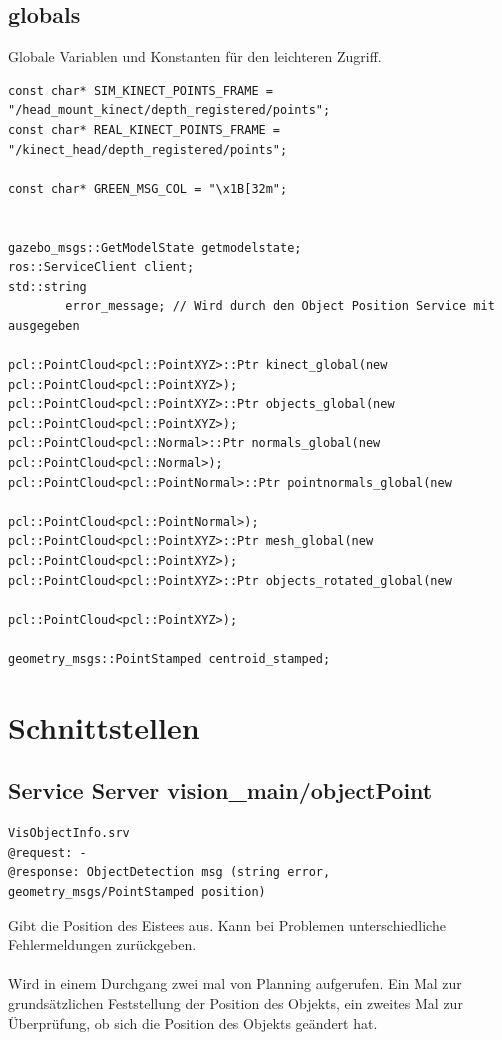 \documentclass{suturo}
\begin{document}
\subsection{globals}
Globale Variablen und Konstanten für den leichteren Zugriff.

\begin{verbatim}
const char* SIM_KINECT_POINTS_FRAME = "/head_mount_kinect/depth_registered/points";
const char* REAL_KINECT_POINTS_FRAME = "/kinect_head/depth_registered/points";

const char* GREEN_MSG_COL = "\x1B[32m";


gazebo_msgs::GetModelState getmodelstate;
ros::ServiceClient client;
std::string
        error_message; // Wird durch den Object Position Service mit ausgegeben

pcl::PointCloud<pcl::PointXYZ>::Ptr kinect_global(new pcl::PointCloud<pcl::PointXYZ>);
pcl::PointCloud<pcl::PointXYZ>::Ptr objects_global(new pcl::PointCloud<pcl::PointXYZ>);
pcl::PointCloud<pcl::Normal>::Ptr normals_global(new pcl::PointCloud<pcl::Normal>);
pcl::PointCloud<pcl::PointNormal>::Ptr pointnormals_global(new
												pcl::PointCloud<pcl::PointNormal>);
pcl::PointCloud<pcl::PointXYZ>::Ptr mesh_global(new pcl::PointCloud<pcl::PointXYZ>);
pcl::PointCloud<pcl::PointXYZ>::Ptr objects_rotated_global(new 	
											 	pcl::PointCloud<pcl::PointXYZ>);

geometry_msgs::PointStamped centroid_stamped;
\end{verbatim}


\section*{Schnittstellen}

\subsection*{Service Server vision\_main/objectPoint}
\begin{verbatim}
VisObjectInfo.srv
@request: -
@response: ObjectDetection msg (string error, geometry_msgs/PointStamped position)
\end{verbatim}
Gibt die Position des Eistees aus. Kann bei Problemen unterschiedliche Fehlermeldungen zurückgeben.
\\ \\
Wird in einem Durchgang zwei mal von Planning aufgerufen. Ein Mal zur grundsätzlichen Feststellung der Position des Objekts, ein zweites Mal zur Überprüfung, ob sich die Position des Objekts geändert hat.
\end{document}
